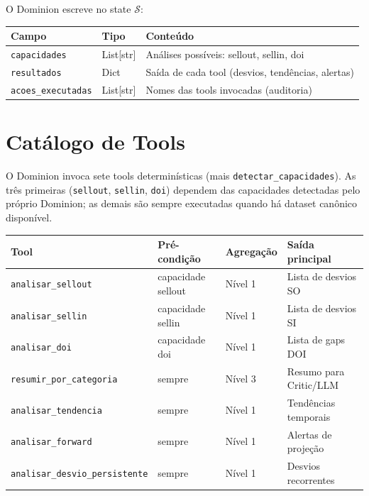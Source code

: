 \documentclass[a4paper, 12pt]{report}
\theoremstyle{definition}
\theoremstyle{remark}
\newcommand{\state}{\mathcal{S}}
\begin{document}
O Dominion escreve no state $\state$:

\begin{center}
\begin{tabular}{llp{6.5cm}}
  \toprule
  \textbf{Campo} & \textbf{Tipo} & \textbf{Conte\'udo} \\
  \midrule
  \texttt{capacidades} & List[str] & An\'alises poss\'iveis: sellout, sellin, doi \\
  \texttt{resultados} & Dict & Sa\'ida de cada tool (desvios, tend\^encias, alertas) \\
  \texttt{acoes\_executadas} & List[str] & Nomes das tools invocadas (auditoria) \\
  \bottomrule
\end{tabular}
\end{center}


\section{Cat\'alogo de Tools}

O Dominion invoca sete tools determin\'isticas (mais
\texttt{detectar\_capacidades}). As tr\^es primeiras
(\texttt{sellout}, \texttt{sellin}, \texttt{doi}) dependem das capacidades
detectadas pelo pr\'oprio Dominion; as demais s\~ao sempre executadas quando
h\'a dataset can\^onico dispon\'ivel.

\begin{center}
\begin{tabular}{llll}
  \toprule
  \textbf{Tool} & \textbf{Pr\'e-condi\c{c}\~ao} & \textbf{Agrega\c{c}\~ao} & \textbf{Sa\'ida principal} \\
  \midrule
  \texttt{analisar\_sellout} & capacidade sellout & N\'ivel 1 & Lista de desvios SO \\
  \texttt{analisar\_sellin} & capacidade sellin & N\'ivel 1 & Lista de desvios SI \\
  \texttt{analisar\_doi} & capacidade doi & N\'ivel 1 & Lista de gaps DOI \\
  \texttt{resumir\_por\_categoria} & sempre & N\'ivel 3 & Resumo para Critic/LLM \\
  \texttt{analisar\_tendencia} & sempre & N\'ivel 1 & Tend\^encias temporais \\
  \texttt{analisar\_forward} & sempre & N\'ivel 1 & Alertas de proje\c{c}\~ao \\
  \texttt{analisar\_desvio\_persistente} & sempre & N\'ivel 1 & Desvios recorrentes \\
  \bottomrule
\end{tabular}
\end{center}
\end{document}
